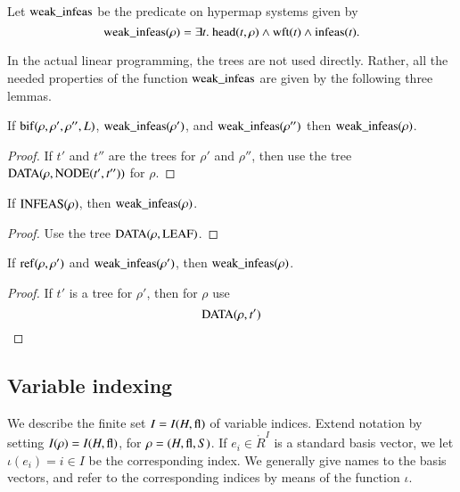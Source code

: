 \begin{definition}
    Let ${\operatorname{weak\_infeas}}$ be the predicate on hypermap systems given by
        $$
        {\operatorname{weak\_infeas}}(\rho) = \exists t.\
        {\operatorname{head}}(t,\rho) \wedge {\operatorname{wft}}(t) \wedge
        {\operatorname{infeas}}(t).
        $$
\end{definition}

In the actual linear programming, the trees are not used directly.
Rather, all the needed properties of the function
${\operatorname{weak\_infeas}}$ are given by the following three lemmas.

\begin{lemma}
If ${\operatorname{bif}}(\rho,\rho',\rho'',L)$, ${\operatorname{weak\_infeas}}(\rho')$,
and
    ${\operatorname{weak\_infeas}}(\rho'')$ then ${\operatorname{weak\_infeas}}(\rho)$.
\end{lemma}

\begin{proof} If $t'$ and $t''$ are the trees for $\rho'$ and
$\rho''$, then use the tree ${\operatorname{DATA}}(\rho,{\operatorname{NODE}}(t',t''))$
for $\rho$.
\end{proof}

\begin{lemma}
If ${\operatorname{INFEAS}}(\rho)$, then ${\operatorname{weak\_infeas}}(\rho)$.
\end{lemma}

\begin{proof} Use the tree ${\operatorname{DATA}}(\rho,{\operatorname{LEAF}})$.
\end{proof}

\begin{lemma}
If ${\operatorname{ref}}(\rho,\rho')$ and ${\operatorname{weak\_infeas}}(\rho')$, then
  ${\operatorname{weak\_infeas}}(\rho)$.
\end{lemma}

\begin{proof} If $t'$ is a tree for $\rho'$, then for $\rho$ use
    $$
    {\operatorname{DATA}}(\rho,t')
    $$
\end{proof}


\subsection{Variable indexing}
\label{sec:var-index}

We describe the finite set $I = I(H,{\operatorname{fl}})$ of variable indices.
Extend notation by setting $I(\rho) = I(H,{\operatorname{fl}})$, for $\rho =
(H,{\operatorname{fl}},S)$.  If $e_i\in \ring{R}^I$ is a standard basis
vector, we let $\iota(e_i)=i\in I$ be the corresponding index.  We
generally give names to the basis vectors, and refer to the
corresponding indices by means of the function $\iota$.





